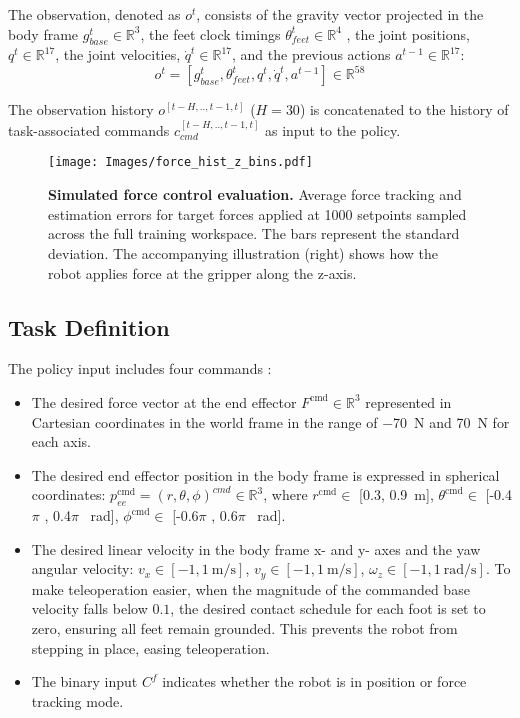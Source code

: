The observation, denoted as $o^t$, consists of  
the gravity vector projected in the body frame $g_{base}^t \in \mathbb{R}^{3}$, the feet clock timings $\theta_{feet}^t \in \mathbb{R}^{4}$ \cite{margolis2022walktheseways}, the joint positions, $q^t \in \mathbb{R}^{17}$, the joint velocities, $\Dot{q}^t \in \mathbb{R}^{17}$, 
and the previous actions $a^{t-1} \in \mathbb{R}^{17}$:
\begin{equation}
    o^t = [g_{base}^t, \theta_{feet}^t, q^t, \Dot{q}^t, a^{t-1}] \in \mathbb{R}^{58} 
\end{equation}

The observation history $o^{[t-H,.., t-1, t]}$ ($H=30$) is concatenated to the history of task-associated commands $c_{cmd}^{[t-H,.., t-1, t]}$ as input to the policy.

\begin{figure}[t!]
\centering

\texttt{[image: Images/force\_hist\_z\_bins.pdf]}

\vspace{-0.2cm}
\caption{\textbf{Simulated force control evaluation.} Average force tracking and estimation errors for target forces applied 
at 1000 setpoints sampled across the full training workspace. The bars represent the standard deviation. The accompanying illustration (right) shows how the robot applies force at the gripper along the z-axis.}
\label{fig:force_z_sim}
\end{figure}


\subsection{Task Definition}
The policy input includes four commands :
\begin{itemize}
    \item The desired force vector at the end effector $F^\textrm{cmd} \in \mathbb{R}^3$ represented in Cartesian coordinates in the world frame in the range of \SI{-70}{\newton} and \SI{70}{\newton} for each axis.
    \item The desired end effector position in the body frame is expressed in spherical coordinates: $p^\textrm{cmd}_{ee}=(r, \theta, \phi)^{cmd} \in \mathbb{R}^3$, where $r^{\text{cmd}} \in$ [\SI{0.3}{}, \SI{0.9}{\meter}], $\theta^{\text{cmd}} \in$ [-0.4$\pi$ \SI{}{}, 0.4$\pi$ \SI{}{\radian}], $\phi^{\text{cmd}} \in$  [-0.6$\pi$ \SI{}{}, 0.6$\pi$ \SI{}{\radian}].
    \item The desired linear velocity in the body frame x- and y- axes and the yaw angular velocity: $v_x \in [-1, \SI{1}{\meter/\second}]$, $v_y \in [-1, \SI{1}{\meter/\second}]$, $\omega_z \in [-1, \SI{1}{\radian/\second}]$. To make teleoperation easier, when the magnitude of the commanded base velocity falls below $0.1$, the desired contact schedule for each foot is set to zero, ensuring all feet remain grounded. 
    This prevents the robot from stepping in place, easing teleoperation. 
    \item The binary input $C^f$ indicates whether the robot is in position or force tracking mode.
\end{itemize}

